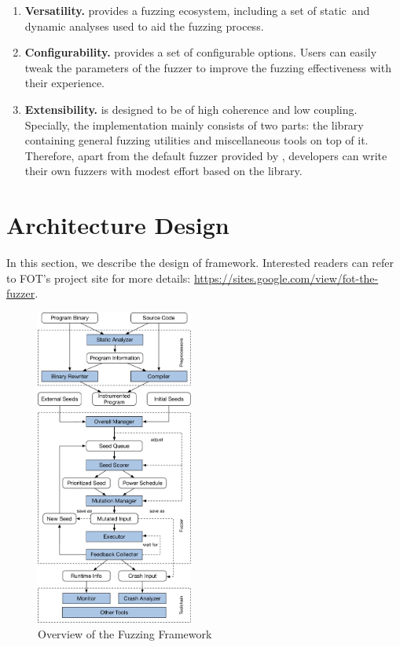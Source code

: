 \begin{enumerate}[(1)]


\item  \textbf{Versatility.}
{\FOT} provides a fuzzing ecosystem, including a set of static~and dynamic analyses used to aid the fuzzing process.


\item \textbf{Configurability.}
{\FOT} provides a set of configurable options.
Users can easily tweak the parameters of the fuzzer to improve the fuzzing effectiveness with their experience.

\item \textbf{Extensibility.}
{\FOT} is designed to be of high coherence and low coupling. Specially, the implementation mainly consists of two parts: the library containing general fuzzing utilities and miscellaneous tools on top of it. Therefore, apart from the default fuzzer provided by {\FOT}, developers can write their own fuzzers with modest effort based on the library.
\end{enumerate}







 

\section{Architecture Design}\label{sec:details}

In this section, we describe the design of {\FOT} framework.
Interested readers can refer to {FOT}'s project site for more details:
\url{https://sites.google.com/view/fot-the-fuzzer}.


\begin{figure}[t]
	\centering
	\includegraphics[width=0.46\textwidth]{res/fot/FOT_overview}
	\vspace{-5pt}
	\caption{Overview of the {\FOT} Fuzzing Framework}
	\label{fig:workflow}
\end{figure}




